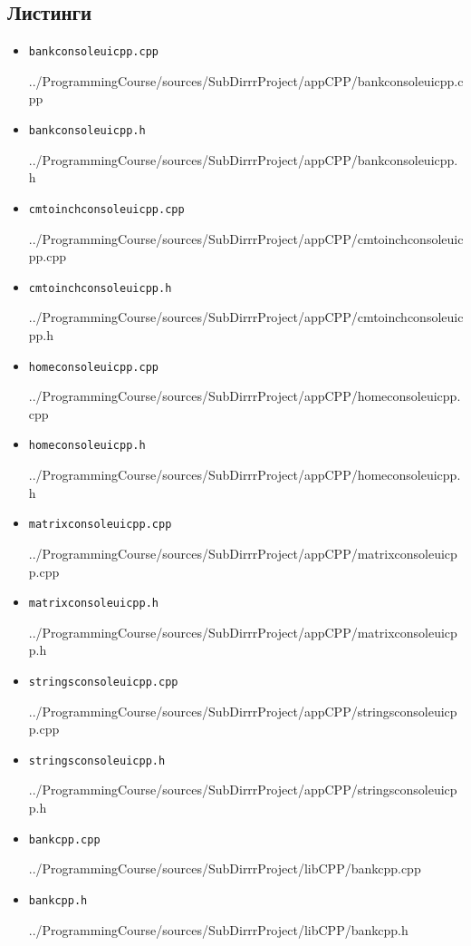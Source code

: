 \documentclass[12pt,a4paper]{report}
\begin{document}
\subsection*{Листинги}
\begin{itemize}

\item[] \verb-bankconsoleuicpp.cpp-

{../ProgrammingCourse/sources/SubDirrrProject/appCPP/bankconsoleuicpp.cpp}

\item[] \verb-bankconsoleuicpp.h-

{../ProgrammingCourse/sources/SubDirrrProject/appCPP/bankconsoleuicpp.h}

\item[] \verb-cmtoinchconsoleuicpp.cpp-

{../ProgrammingCourse/sources/SubDirrrProject/appCPP/cmtoinchconsoleuicpp.cpp}

\item[] \verb-cmtoinchconsoleuicpp.h-

{../ProgrammingCourse/sources/SubDirrrProject/appCPP/cmtoinchconsoleuicpp.h}

\item[] \verb-homeconsoleuicpp.cpp-

{../ProgrammingCourse/sources/SubDirrrProject/appCPP/homeconsoleuicpp.cpp}

\item[] \verb-homeconsoleuicpp.h-

{../ProgrammingCourse/sources/SubDirrrProject/appCPP/homeconsoleuicpp.h}

\item[] \verb-matrixconsoleuicpp.cpp-

{../ProgrammingCourse/sources/SubDirrrProject/appCPP/matrixconsoleuicpp.cpp}

\item[] \verb-matrixconsoleuicpp.h-

{../ProgrammingCourse/sources/SubDirrrProject/appCPP/matrixconsoleuicpp.h}

\item[] \verb-stringsconsoleuicpp.cpp-

{../ProgrammingCourse/sources/SubDirrrProject/appCPP/stringsconsoleuicpp.cpp}

\item[] \verb-stringsconsoleuicpp.h-

{../ProgrammingCourse/sources/SubDirrrProject/appCPP/stringsconsoleuicpp.h}

\item[] \verb-bankcpp.cpp-

{../ProgrammingCourse/sources/SubDirrrProject/libCPP/bankcpp.cpp}

\item[] \verb-bankcpp.h-

{../ProgrammingCourse/sources/SubDirrrProject/libCPP/bankcpp.h}


\end{itemize}
\end{document}
